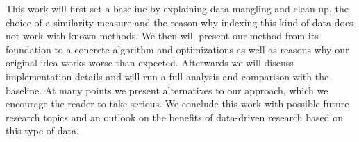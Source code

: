 This work will first set a baseline by explaining data mangling and clean-up, the choice of a similarity measure and the reason why indexing this kind of data does not work with known methods. We then will present our method from its foundation to a concrete algorithm and optimizations as well as reasons why our original idea works worse than expected. Afterwards we will discuss implementation details and will run a full analysis and comparison with the baseline. At many points we present alternatives to our approach, which we encourage the reader to take serious. We conclude this work with possible future research topics and an outlook on the benefits of data-driven research based on this type of data.
